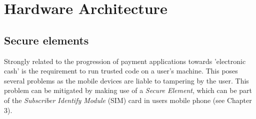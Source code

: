 \chapter{Hardware Architecture}
\label{chap:hardware_architecture}






\section{Secure elements}
Strongly related to the progression of payment applications towards 'electronic cash' is the requirement to run trusted code on a user's machine.
This poses several problems as the mobile devices are liable to tampering by the user.
This problem can be mitigated by making use of a \textit{Secure Element}, which can be part of the \textit{Subscriber Identify Module} (SIM) card in users mobile phone (see Chapter 3).


